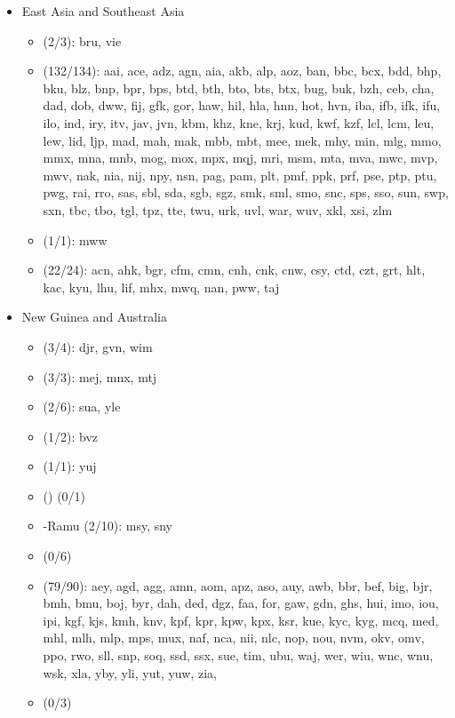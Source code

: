 \begin{itemize}[label={},leftmargin=0cm,labelindent=5pt,itemindent=0pt]
  \item East Asia and Southeast Asia
    \begin{itemize}[label={},leftmargin=!,labelindent=5pt,itemindent=-15pt]
  	\item {} (2/3): bru, vie
  	\item {} (132/134): aai, ace, adz, agn, aia, akb, alp, aoz, ban, bbc, bcx, bdd, bhp, bku, blz, bnp, bpr, bps, btd, bth, bto, bts, btx, bug, buk, bzh, ceb, cha, dad, dob, dww, fij, gfk, gor, haw, hil, hla, hnn, hot, hvn, iba, ifb, ifk, ifu, ilo, ind, iry, itv, jav, jvn, kbm, khz, kne, krj, kud, kwf, kzf, lcl, lcm, leu, lew, lid, ljp, mad, mah, mak, mbb, mbt, mee, mek, mhy, min, mlg, mmo, mmx, mna, mnb, mog, mox, mpx, mqj, mri, msm, mta, mva, mwc, mvp, mwv, nak, nia, nij, npy, nsn, pag, pam, plt, pmf, ppk, prf, pse, ptp, ptu, pwg, rai, rro, sas, sbl, sda, sgb, sgz, smk, sml, smo, snc, sps, sso, sun, swp, sxn, tbc, tbo, tgl, tpz, tte, twu, urk, uvl, war, wuv, xkl, xsi, zlm
  	\item {} (1/1): mww
  	\item {} (22/24): acn, ahk, bgr, cfm, cmn, cnh, cnk, cnw, csy, ctd, czt, grt, hlt, kac, kyu, lhu, lif, mhx, mwq, nan, pww, taj
    \end{itemize}

  \item New Guinea and Australia
    \begin{itemize}[label={},leftmargin=!,labelindent=5pt,itemindent=-15pt]
  	\item {} (3/4): djr, gvn, wim
  	\item {} (3/3): mej, mnx, mtj
  	\item {} (2/6): sua, yle
  	\item {} (1/2): bvz
  	\item {} (1/1): yuj
  	\item {} () (0/1)
  	\item {}-Ramu (2/10): msy, sny
  	\item {} (0/6)
  	\item {} (79/90): aey, agd, agg, amn, aom, apz, aso, auy, awb, bbr, bef, big, bjr, bmh, bmu, boj, byr, dah, ded, dgz, faa, for, gaw, gdn, ghs, hui, imo, iou, ipi, kgf, kjs, kmh, knv, kpf, kpr, kpw, kpx, ksr, kue, kyc, kyg, mcq, med, mhl, mlh, mlp, mps, mux, naf, nca, nii, nlc, nop, nou, nvm, okv, omv, ppo, rwo, sll, snp, soq, ssd, ssx, sue, tim, ubu, waj, wer, wiu, wnc, wnu, wsk, xla, yby, yli, yut, yuw, zia,
  	\item {} (0/3)
    \end{itemize}


\end{itemize}
